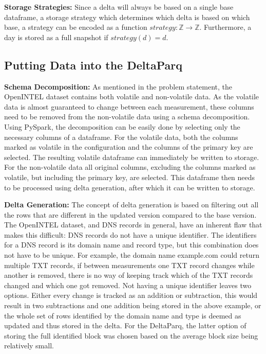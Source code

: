 \textbf{Storage Strategies:} Since a delta will always be based on a single base dataframe, a storage strategy which determines 
which delta is based on which base, a strategy can be encoded as a function $strategy: \mathbb{Z} \rightarrow 
\mathbb{Z}$. Furthermore, a day is stored as a full snapshot if $strategy(d) = d$.

\subsection{Putting Data into the DeltaParq}

\textbf{Schema Decomposition:} As mentioned in the problem statement, the OpenINTEL dataset 
contains both volatile and non-volatile data. As the volatile data is almost guaranteed 
to change between each measurement, these columns need to be removed from the non-volatile 
data using a schema decomposition. Using PySpark, the decomposition can be easily done by 
selecting only the necessary columns of a dataframe. For the volatile data, both the columns 
marked as volatile in the configuration and the columns of the primary key are selected. 
The resulting volatile dataframe can immediately be written to storage.
For the non-volatile data all original columns, excluding the columns marked as volatile, 
but including the primary key, are selected. This dataframe then needs to be processed 
using delta generation, after which it can be written to storage.

\textbf{Delta Generation:} The concept of delta generation is based on filtering out all the rows that are different 
in the updated version compared to the base version. The OpenINTEL dataset, and DNS records 
in general, have an inherent flaw that makes this difficult: DNS records do not have a unique identifier.
The identifiers for a DNS record is its domain name and record type, but this combination does not have to be
unique. For example, the domain name example.com could return multiple TXT records, if between measurements
one TXT record changes while another is removed, there is no way of keeping track which of the TXT records 
changed and which one got removed. Not having a unique identifier leaves two options. Either every change is tracked 
as an addition or subtraction, this would result in two subtractions and one addition being stored in the above example, 
or the whole set of rows identified by the domain name and type is deemed as updated and thus stored in the delta.
For the DeltaParq, the latter option of storing the full identified block was chosen based on the average block size 
being relatively small. \\ 

